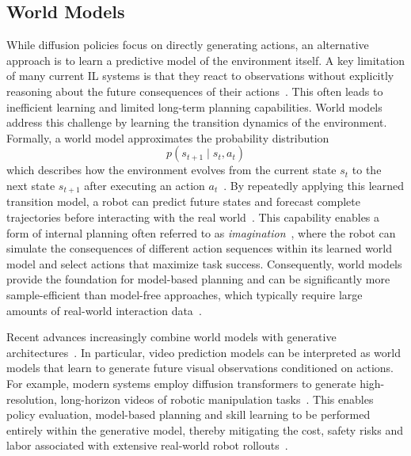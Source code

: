 \subsection{World Models}
While diffusion policies focus on directly generating actions, an alternative approach is to learn a predictive model of the environment itself. A key limitation of many current \ac{IL} systems is that they react to observations without explicitly reasoning about the future consequences of their actions~\cite{Eze2024LearningBW}. This often leads to inefficient learning and limited long-term planning capabilities.
World models address this challenge by learning the transition dynamics of the environment. Formally, a world model approximates the probability distribution
\begin{equation}
	p(s_{t+1} \mid s_t, a_t)	
\end{equation}
which describes how the environment evolves from the current state $s_t$ to the next state $s_{t+1}$ after executing an action $a_t$~\cite{Eze2024LearningBW}. By repeatedly applying this learned transition model, a robot can predict future states and forecast complete trajectories before interacting with the real world~\cite{Mendonca2023StructuredWM}.
This capability enables a form of internal planning often referred to as \textit{imagination}~\cite{Mendonca2023StructuredWM}, where the robot can simulate the consequences of different action sequences within its learned world model and select actions that maximize task success. Consequently, world models provide the foundation for model-based planning and can be significantly more sample-efficient than model-free approaches, which typically require large amounts of real-world interaction data~\cite{Wang2026WorldMF}.

Recent advances increasingly combine world models with generative architectures~\cite{Wang2026WorldMF}. In particular, video prediction models can be interpreted as world models that learn to generate future visual observations conditioned on actions.
For example, modern systems employ diffusion transformers to generate high-resolution, long-horizon videos of robotic manipulation tasks~\cite{Wang2026WorldMF}. This enables policy evaluation, model-based planning and skill learning to be performed entirely within the generative model, thereby mitigating the cost, safety risks and labor associated with extensive real-world robot rollouts~\cite{zhu2024maniwm}.

